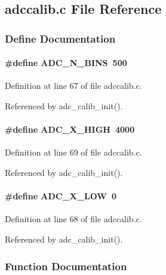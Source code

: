 \subsection{adccalib.c File Reference}
\label{adccalib_8c}


\subsubsection{Define Documentation}
\paragraph[{ADC\_\-N\_\-BINS}]{\setlength{\rightskip}{0pt plus 5cm}\#define ADC\_\-N\_\-BINS~500}\hfill\label{adccalib_8c_a00d3bd7d1b0b20922574469f786fb42b}


Definition at line 67 of file adccalib.c.

Referenced by adc\_\-calib\_\-init().
\paragraph[{ADC\_\-X\_\-HIGH}]{\setlength{\rightskip}{0pt plus 5cm}\#define ADC\_\-X\_\-HIGH~4000}\hfill\label{adccalib_8c_aba2e3a40c26f6a8950bb6428e4a28818}


Definition at line 69 of file adccalib.c.

Referenced by adc\_\-calib\_\-init().
\paragraph[{ADC\_\-X\_\-LOW}]{\setlength{\rightskip}{0pt plus 5cm}\#define ADC\_\-X\_\-LOW~0}\hfill\label{adccalib_8c_a5bc8020f1ec2ea1e071ec2e45748ac52}


Definition at line 68 of file adccalib.c.

Referenced by adc\_\-calib\_\-init().

\subsubsection{Function Documentation}
